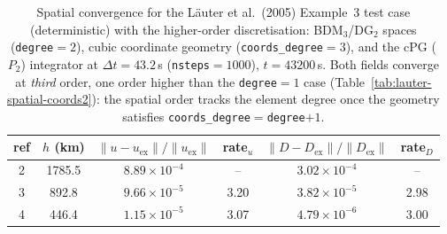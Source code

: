 
\begin{table}[htbp]
  \centering
  \begin{tabular}{c c c c c c}
    \toprule
    ref & $h$ (km) & $\|u-u_{\mathrm{ex}}\|/\|u_{\mathrm{ex}}\|$ & rate$_u$
        & $\|D-D_{\mathrm{ex}}\|/\|D_{\mathrm{ex}}\|$ & rate$_D$ \\
    \midrule
    2 & 1785.5 & $8.89\times10^{-4}$ & --   & $3.02\times10^{-4}$ & --   \\
    3 &  892.8 & $9.66\times10^{-5}$ & 3.20 & $3.82\times10^{-5}$ & 2.98 \\
    4 &  446.4 & $1.15\times10^{-5}$ & 3.07 & $4.79\times10^{-6}$ & 3.00 \\
    \bottomrule
  \end{tabular}
  \caption{Spatial convergence for the Läuter et al.\ (2005) Example~3 test case
    (deterministic) with the higher-order discretisation: BDM$_3$/DG$_2$ spaces
    (\texttt{degree}$=2$), cubic coordinate geometry (\texttt{coords\_degree}$=3$),
    and the cPG ($P_2$) integrator at $\Delta t = 43.2$\,s (\texttt{nsteps}$=1000$),
    $t = 43200$\,s. Both fields converge at \emph{third} order, one order higher than
    the \texttt{degree}$=1$ case (Table~\ref{tab:lauter-spatial-coords2}): the spatial
    order tracks the element degree once the geometry satisfies
    \texttt{coords\_degree}$=$\texttt{degree}$+1$.}
  \label{tab:lauter-spatial-deg2}
\end{table}

